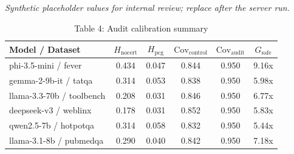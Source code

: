 

\begin{table}[h]
\centering
\small
  \textit{Synthetic placeholder values for internal review; replace after the server run.}
\caption{Table 4: Audit calibration summary}
\label{tab:audit_calibration_summary}
\begin{tabular}{l|cc|cc|c}
\hline
Model / Dataset & $H_{\mathrm{nocert}}$ & $H_{\mathrm{pcg}}$ & $\mathrm{Cov}_{\mathrm{control}}$ & $\mathrm{Cov}_{\mathrm{audit}}$ & $G_{\mathrm{safe}}$ \\
\hline
phi-3.5-mini / fever & 0.434 & 0.047 & 0.844 & 0.950 & 9.16x \\
gemma-2-9b-it / tatqa & 0.314 & 0.053 & 0.838 & 0.950 & 5.98x \\
llama-3.3-70b / toolbench & 0.208 & 0.031 & 0.846 & 0.950 & 6.77x \\
deepseek-v3 / weblinx & 0.178 & 0.031 & 0.852 & 0.950 & 5.83x \\
qwen2.5-7b / hotpotqa & 0.314 & 0.058 & 0.832 & 0.950 & 5.44x \\
llama-3.1-8b / pubmedqa & 0.290 & 0.040 & 0.842 & 0.950 & 7.18x \\
\hline
\end{tabular}
\end{table}
